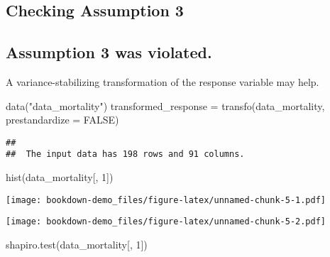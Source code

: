 \documentclass[
]{book}
\newenvironment{Shaded}{\begin{snugshade}}{\end{snugshade}}
\newcommand{\AttributeTok}[1]{\textcolor[rgb]{0.77,0.63,0.00}{#1}}
\newcommand{\ConstantTok}[1]{\textcolor[rgb]{0.00,0.00,0.00}{#1}}
\newcommand{\DecValTok}[1]{\textcolor[rgb]{0.00,0.00,0.81}{#1}}
\newcommand{\FunctionTok}[1]{\textcolor[rgb]{0.00,0.00,0.00}{#1}}
\newcommand{\NormalTok}[1]{#1}
\newcommand{\OtherTok}[1]{\textcolor[rgb]{0.56,0.35,0.01}{#1}}
\newcommand{\SpecialCharTok}[1]{\textcolor[rgb]{0.00,0.00,0.00}{#1}}
\newcommand{\StringTok}[1]{\textcolor[rgb]{0.31,0.60,0.02}{#1}}
\begin{document}
\hypertarget{checking-assumption-3}{%
\subsection{Checking Assumption 3}\label{checking-assumption-3}}

\hypertarget{assumption-3-was-violated.}{%
\subsection{Assumption 3 was violated.}\label{assumption-3-was-violated.}}

A variance-stabilizing transformation of the response variable may help.

\begin{Shaded}
\begin{Highlighting}[]
\FunctionTok{data}\NormalTok{(}\StringTok{"data\_mortality"}\NormalTok{)}
\NormalTok{transformed\_response }\OtherTok{=} \FunctionTok{transfo}\NormalTok{(data\_mortality, }\AttributeTok{prestandardize =} \ConstantTok{FALSE}\NormalTok{)}
\end{Highlighting}
\end{Shaded}

\begin{verbatim}
##  
##  The input data has 198 rows and 91 columns.
\end{verbatim}

\begin{Shaded}
\begin{Highlighting}[]
\FunctionTok{hist}\NormalTok{(data\_mortality[, }\DecValTok{1}\NormalTok{])}
\end{Highlighting}
\end{Shaded}

\texttt{[image: bookdown-demo\_files/figure-latex/unnamed-chunk-5-1.pdf]}

\begin{Shaded}
\end{Shaded}

\texttt{[image: bookdown-demo\_files/figure-latex/unnamed-chunk-5-2.pdf]}

\begin{Shaded}
\begin{Highlighting}[]
\FunctionTok{shapiro.test}\NormalTok{(data\_mortality[, }\DecValTok{1}\NormalTok{])}
\end{Highlighting}
\end{Shaded}
\end{document}
